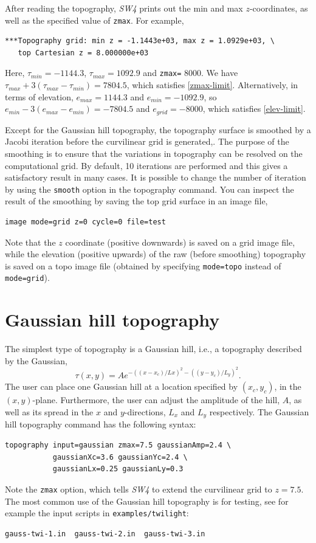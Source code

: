 \documentclass[11pt]{report}
\begin{document}
{After reading the topography, \emph{SW4} prints out the min and max $z$-coordinates, as well as the
specified value of \verb+zmax+. For example,
\begin{verbatim}
***Topography grid: min z = -1.1443e+03, max z = 1.0929e+03, \
   top Cartesian z = 8.000000e+03
\end{verbatim}
Here, $\tau_{min} = -1144.3$, $\tau_{max} = 1092.9$ and \verb+zmax=+ 8000.  We have $\tau_{max} +
	3(\tau_{max}-\tau_{min})=7804.5$, which satisfies \eqref{zmax-limit}. Alternatively, in terms of
elevation, $e_{max}=1144.3$ and $e_{min}=-1092.9$, so $e_{min} - 3(e_{max}-e_{min}) = -7804.5$ and
$e_{grid}=-8000$, which satisfies \eqref{elev-limit}.

Except for the Gaussian hill topography, the topography surface is smoothed by a Jacobi iteration
before the curvilinear grid is generated,. The purpose of the smoothing is to ensure that the
variations in topography can be resolved on the computational grid. By default, 10 iterations are
performed and this gives a satisfactory result in many cases. It is possible to change the number of
iteration by using the \verb+smooth+ option in the topography command. You can inspect the result of
the smoothing by saving the top grid surface in an image file,
\begin{verbatim}
image mode=grid z=0 cycle=0 file=test
\end{verbatim}
Note that the $z$ coordinate (positive downwards) is saved on a grid image file, while the elevation
(positive upwards) of the raw (before smoothing) topography is saved on a topo image file (obtained by
specifying \verb+mode=topo+ instead of \verb+mode=grid+).

\section{Gaussian hill topography}\label{sec:topo-gauss-hill}
The simplest type of topography is a Gaussian hill, i.e., a topography described by the Gaussian,
\[
	\tau(x,y)= A e^{-( (x-x_c)/Lx )^2 - ( (y-y_c)/L_y )^2}.
\]
The user can place one Gaussian hill at a location specified by $(x_c,y_c)$, in the $(x,y)$-plane.
Furthermore, the user can adjust the amplitude of the hill, $A$, as well as
its spread in the $x$ and $y$-directions, $L_x$ and $L_y$ respectively.
The Gaussian hill topography command has the following syntax:
\begin{verbatim}
topography input=gaussian zmax=7.5 gaussianAmp=2.4 \
           gaussianXc=3.6 gaussianYc=2.4 \
           gaussianLx=0.25 gaussianLy=0.3
\end{verbatim}
Note the \verb+zmax+ option, which tells \emph{SW4} to extend the curvilinear grid to $z=7.5$.
The most common use of the Gaussian hill topography is for testing, see for example the input
scripts in \verb+examples/twilight+:
\begin{verbatim}
gauss-twi-1.in  gauss-twi-2.in  gauss-twi-3.in 
\end{verbatim}

}
\end{document}
